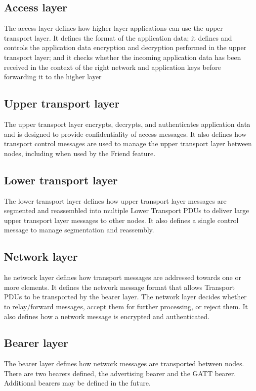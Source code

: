 \documentclass[\main/main.tex]{subfiles}
\begin{document}
\subsection{Access layer}
The access layer defines how higher layer applications can use the upper transport layer. It defines the format of the application data; it defines and controls the application data encryption and decryption performed in the upper transport layer; and it checks whether the incoming application data has been received in the context of the right network and application keys before forwarding it to the higher layer

\subsection{Upper transport layer}
The upper transport layer encrypts, decrypts, and authenticates application data and is designed to provide confidentiality of access messages. It also defines how transport control messages are used to manage the upper transport layer between nodes, including when used by the Friend feature.

\subsection{Lower transport layer}
The lower transport layer defines how upper transport layer messages are segmented and reassembled into multiple Lower Transport PDUs to deliver large upper transport layer messages to other nodes. It also defines a single control message to manage segmentation and reassembly.

\subsection{Network layer}
he network layer defines how transport messages are addressed towards one or more elements. It
defines the network message format that allows Transport PDUs to be transported by the bearer layer.
The network layer decides whether to relay/forward messages, accept them for further processing, or
reject them. It also defines how a network message is encrypted and authenticated.

\subsection{Bearer layer}
The bearer layer defines how network messages are transported between nodes. There are two bearers
defined, the advertising bearer and the GATT bearer. Additional bearers may be defined in the future.
\end{document}
